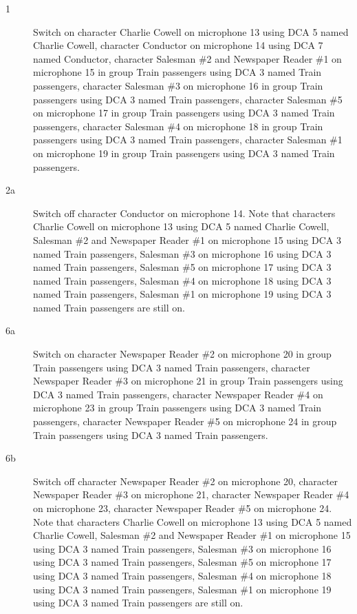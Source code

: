 \begin{description}
\item[1]
Switch on character Charlie Cowell on microphone 13 using DCA 5 named Charlie Cowell, character Conductor on microphone 14 using DCA 7 named Conductor, character Salesman \#2 and Newspaper Reader \#1 on microphone 15 in group Train passengers using DCA 3 named Train passengers, character Salesman \#3 on microphone 16 in group Train passengers using DCA 3 named Train passengers, character Salesman \#5 on microphone 17 in group Train passengers using DCA 3 named Train passengers, character Salesman \#4 on microphone 18 in group Train passengers using DCA 3 named Train passengers, character Salesman \#1 on microphone 19 in group Train passengers using DCA 3 named Train passengers. 

\item[2a]
Switch off character Conductor on microphone 14. Note that characters Charlie Cowell on microphone 13 using DCA 5 named Charlie Cowell, Salesman \#2 and Newspaper Reader \#1 on microphone 15 using DCA 3 named Train passengers, Salesman \#3 on microphone 16 using DCA 3 named Train passengers, Salesman \#5 on microphone 17 using DCA 3 named Train passengers, Salesman \#4 on microphone 18 using DCA 3 named Train passengers, Salesman \#1 on microphone 19 using DCA 3 named Train passengers are still on.  

\item[6a]
Switch on character Newspaper Reader \#2 on microphone 20 in group Train passengers using DCA 3 named Train passengers, character Newspaper Reader \#3 on microphone 21 in group Train passengers using DCA 3 named Train passengers, character Newspaper Reader \#4 on microphone 23 in group Train passengers using DCA 3 named Train passengers, character Newspaper Reader \#5 on microphone 24 in group Train passengers using DCA 3 named Train passengers. 

\item[6b]
Switch off character Newspaper Reader \#2 on microphone 20, character Newspaper Reader \#3 on microphone 21, character Newspaper Reader \#4 on microphone 23, character Newspaper Reader \#5 on microphone 24. Note that characters Charlie Cowell on microphone 13 using DCA 5 named Charlie Cowell, Salesman \#2 and Newspaper Reader \#1 on microphone 15 using DCA 3 named Train passengers, Salesman \#3 on microphone 16 using DCA 3 named Train passengers, Salesman \#5 on microphone 17 using DCA 3 named Train passengers, Salesman \#4 on microphone 18 using DCA 3 named Train passengers, Salesman \#1 on microphone 19 using DCA 3 named Train passengers are still on.  


\end{description}
